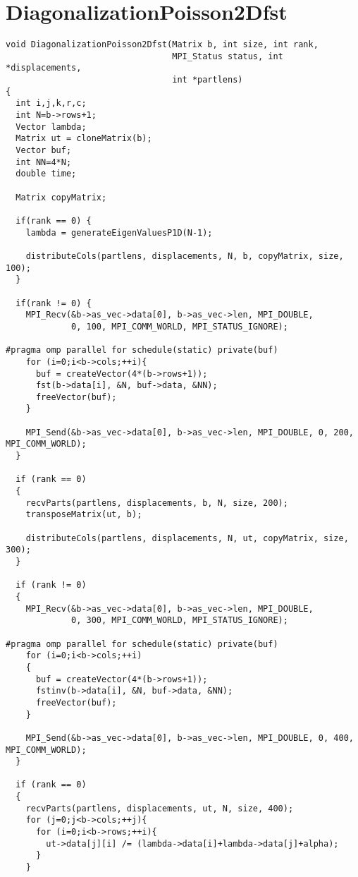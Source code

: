 
\section{DiagonalizationPoisson2Dfst} %
\label{sec:DiagonalizationPoisson2Dfst}

\begin{lstlisting}
void DiagonalizationPoisson2Dfst(Matrix b, int size, int rank,
                                 MPI_Status status, int *displacements,
                                 int *partlens)
{
  int i,j,k,r,c;
  int N=b->rows+1;
  Vector lambda;
  Matrix ut = cloneMatrix(b);
  Vector buf;
  int NN=4*N;
  double time;

  Matrix copyMatrix;

  if(rank == 0) {
    lambda = generateEigenValuesP1D(N-1);

    distributeCols(partlens, displacements, N, b, copyMatrix, size, 100);
  }

  if(rank != 0) {
    MPI_Recv(&b->as_vec->data[0], b->as_vec->len, MPI_DOUBLE,
             0, 100, MPI_COMM_WORLD, MPI_STATUS_IGNORE);

#pragma omp parallel for schedule(static) private(buf)
    for (i=0;i<b->cols;++i){
      buf = createVector(4*(b->rows+1));
      fst(b->data[i], &N, buf->data, &NN);
      freeVector(buf);
    }

    MPI_Send(&b->as_vec->data[0], b->as_vec->len, MPI_DOUBLE, 0, 200, MPI_COMM_WORLD);
  }

  if (rank == 0)
  {
    recvParts(partlens, displacements, b, N, size, 200);
    transposeMatrix(ut, b);

    distributeCols(partlens, displacements, N, ut, copyMatrix, size, 300);
  }

  if (rank != 0)
  {
    MPI_Recv(&b->as_vec->data[0], b->as_vec->len, MPI_DOUBLE,
             0, 300, MPI_COMM_WORLD, MPI_STATUS_IGNORE);

#pragma omp parallel for schedule(static) private(buf)
    for (i=0;i<b->cols;++i)
    {
      buf = createVector(4*(b->rows+1));
      fstinv(b->data[i], &N, buf->data, &NN);
      freeVector(buf);
    }

    MPI_Send(&b->as_vec->data[0], b->as_vec->len, MPI_DOUBLE, 0, 400, MPI_COMM_WORLD);
  }

  if (rank == 0)
  {
    recvParts(partlens, displacements, ut, N, size, 400);
    for (j=0;j<b->cols;++j){
      for (i=0;i<b->rows;++i){
        ut->data[j][i] /= (lambda->data[i]+lambda->data[j]+alpha);
      }
    }


\end{lstlisting}
